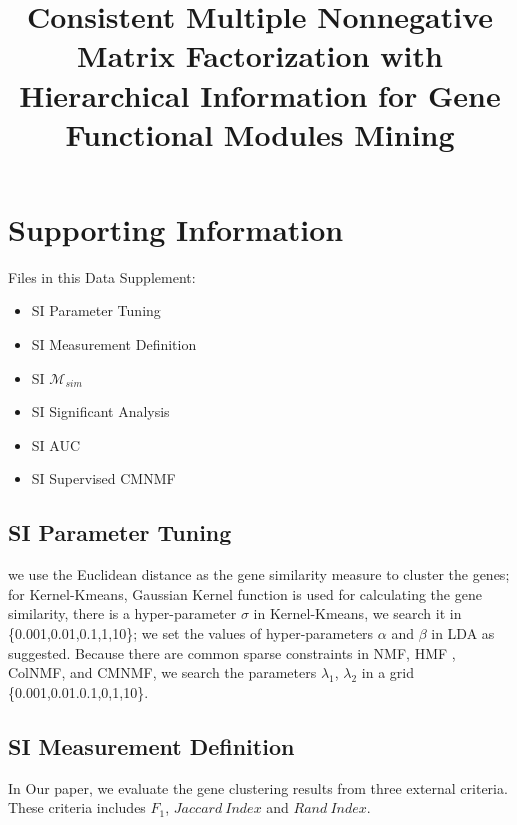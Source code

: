 \documentclass{article}
\begin{document}
\title{Consistent Multiple Nonnegative Matrix Factorization with Hierarchical Information for Gene Functional Modules Mining}
\date{}
\maketitle

\section*{Supporting Information}
Files in this Data Supplement:
\begin{itemize}
\item SI Parameter Tuning
\item SI Measurement Definition
\item SI $\mathcal{M}_{sim}$
\item SI Significant Analysis
\item SI AUC
\item SI Supervised CMNMF
\end{itemize}
\subsection*{\textbf{SI Parameter Tuning}}
we use the Euclidean distance as the gene similarity measure to cluster the genes; for Kernel-Kmeans, Gaussian Kernel function is used for calculating the gene similarity, there is a hyper-parameter $\sigma$ in Kernel-Kmeans, we search it in \{0.001,0.01,0.1,1,10\}; we set the values of hyper-parameters $\alpha$ and $\beta$ in LDA as \cite{Wei2006} suggested. Because there are common sparse constraints in NMF, HMF , ColNMF, and CMNMF, we search the parameters $\lambda_1$, $\lambda_2$ in a grid \{0.001,0.01.0.1,0,1,10\}.
\subsection*{\textbf{SI Measurement Definition}}
In Our paper, we evaluate the gene clustering results from three external criteria. These criteria includes $F_1$, $Jaccard\ Index$ and $Rand\ Index$.
\end{document}
